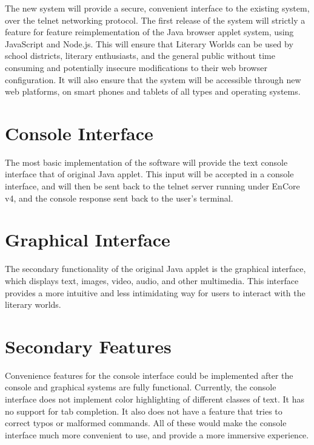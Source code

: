 \documentclass[12pt, letterpaper]{report}
\begin{document}
\par
The new system will provide a secure, convenient interface to the existing system, over the telnet networking protocol. The first release of the system will strictly a feature for feature reimplementation of the Java browser applet system, using JavaScript and Node.js. This will ensure that Literary Worlds can be used by school districts, literary enthusiasts, and the general public without time consuming and potentially insecure modifications to their web browser configuration. It will also ensure that the system will be accessible through new web platforms, on smart phones and tablets of all types and operating systems.

\section{Console Interface}
The most basic implementation of the software will provide the text console interface that of original Java applet. This input will be accepted in a console interface, and will then be sent back to the telnet server running under EnCore v4, and the console response sent back to the user's terminal.

\section{Graphical Interface}
The secondary functionality of the original Java applet is the graphical interface, which displays text, images, video, audio, and other multimedia. This interface provides a more intuitive and less intimidating way for users to interact with the literary worlds. 

\section{Secondary Features}
Convenience features for the console interface could be implemented after the console and graphical systems are fully functional. Currently, the console interface does not implement color highlighting of different classes of text. It has no support for tab completion. It also does not have a feature that tries to correct typos or malformed commands. All of these would make the console interface much more convenient to use, and provide a more immersive experience.

\par



\end{document}
